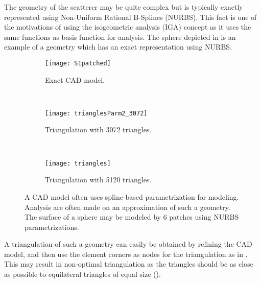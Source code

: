The geometry of the scatterer may be quite complex but is typically exactly represented using Non-Uniform Rational B-Splines (NURBS). This fact is one of the motivations of using the isogeometric analysis (IGA) concept as it uses the same functions as basis function for analysis. The sphere depicted in  is an example of a geometry which has an exact representation using NURBS.
\begin{figure}
	\centering
	\begin{subfigure}[t]{0.3\textwidth}
		\centering
		\texttt{[image: S1patched]}
		\caption{Exact CAD model.}
		\label{Fig4:SphericalShellCAD}
	\end{subfigure}
	~
	\begin{subfigure}[t]{0.3\textwidth}
		\centering
		\texttt{[image: trianglesParm2\_3072]}
		\caption{Triangulation with 3072 triangles.}
		\label{Fig4:SphericalShellTriangles1}
	\end{subfigure}
	~
	\begin{subfigure}[t]{0.3\textwidth}
		\centering
		\texttt{[image: triangles]}
		\caption{Triangulation with 5120 triangles.}
		\label{Fig4:SphericalShellTriangles2}
	\end{subfigure}
	\caption{A CAD model often uses spline-based parametrization for modeling. Analysis are often made on an approximation of such a geometry. The surface of a sphere may be modeled by 6 patches using NURBS parametrizations.}
	\label{Fig4:SphericalShell}
\end{figure} 
A triangulation of such a geometry can easily be obtained by refining the CAD model, and then use the element corners as nodes for the triangulation as in . This may result in non-optimal triangulation as the triangles should be as close as possible to equilateral triangles of equal size (). 

